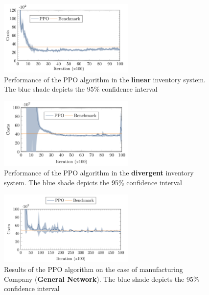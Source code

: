 \documentclass[12pt]{article}
\begin{document}
\begin{figure}[H]
    \centering
    \includegraphics[width=0.6\textwidth]{Images/linearnetwork.png}
    \caption{Performance of the PPO algorithm in the \textbf{linear} inventory system. The blue shade depicts the 95\% confidence interval}
    \label{fig:5-linearnetwork}
\end{figure} 

\begin{figure}[H]
    \centering
    \includegraphics[width=0.6\textwidth]{Images/divergentnetwork.png}
    \caption{Performance of the PPO algorithm in the \textbf{divergent} inventory system. The blue shade depicts the 95\% confidence interval}
    \label{fig:5-divergentnetwork}
\end{figure} 

\begin{figure}[H]
    \centering
    \includegraphics[width=0.6\textwidth]{Images/generalnetwork.png}
    \caption{Results of the PPO algorithm on the case of manufacturing Company (\textbf{General Network}). The blue shade depicts the 95\% confidence interval}
    \label{fig:5-generalnetwork}
\end{figure} 

\newpage



\end{document}
